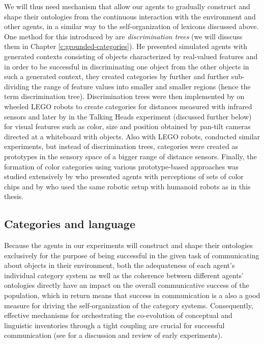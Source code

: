 We will thus need mechanism that allow our agents to gradually
construct and shape their ontologies from the continuous interaction
with the environment and other agents, in a similar way to the
self-organization of lexicons discussed above. One method for this
introduced by \cite{steels96perceptually} are \emph{discrimination
  trees} (we will disscuss them in Chapter
\ref{c:grounded-categories}). He presented simulated agents with
generated contexts consisting of objects characterized by real-valued
features and in order to be successful in discriminating one object
from the other objects in such a generated context, they created
categories by further and further sub-dividing the range of feature
values into smaller and smaller regions (hence the term discrimination
tree).  Discrimination trees were then implemented by
\cite{steels97constructing,steels97grounding} on wheeled LEGO robots
to create categories for distances measured with infrared sensors and
later by
\citep{steels99situated,steels99collective,steels02bootstrapping} in
the Talking Heads experiment (discussed further below) for visual
features such as color, size and position obtained by pan-tilt cameras
directed at a whiteboard with objects. Also with LEGO robots,
\cite{vogt01bootstrapping,vogt03anchoring} conducted similar
experiments, but instead of discrimination trees, categories were
created as prototypes in the sensory space of a bigger range of
distance sensors. Finally, the formation of color categories using
various prototype-based approaches was studied extensively by
\cite{steels05coordinating} who presented agents with perceptions of
sets of color chips and by \cite*{bleys09grounded} who used the same
robotic setup with humanoid robots as in this thesis.




\subsection{Categories and language}

Because the agents in our experiments will construct and shape their
ontologies exclusively for the purpose of being successful in the
given task of communicating about objects in their environment, both
the adequateness of each agent's individual category system as well as
the coherence between different agents' ontologies directly have an
impact on the overall communicative success of the population, which
in return means that success in communication is a also a good measure
for driving the self-organization of the category
systems. Consequently, effective mechanisms for orchestrating the
co-evolution of conceptual and linguistic inventories through a tight
coupling are crucial for successful communication (see
\citealp{steels98origins-ontologies} for a discussion and review of
early experiments).

